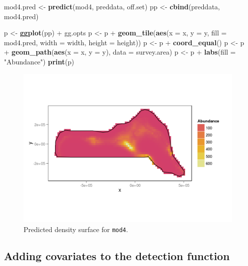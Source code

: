 \documentclass[]{amsart}
\makeatletter
\newenvironment{Shaded}{}{}
\newcommand{\KeywordTok}[1]{\textcolor[rgb]{0.00,0.44,0.13}{\textbf{{#1}}}}
\newcommand{\DataTypeTok}[1]{\textcolor[rgb]{0.56,0.13,0.00}{{#1}}}
\newcommand{\StringTok}[1]{\textcolor[rgb]{0.25,0.44,0.63}{{#1}}}
\newcommand{\NormalTok}[1]{{#1}}
\def\maxwidth{\ifdim\Gin@nat@width>\linewidth\linewidth
\else\Gin@nat@width\fi}
\let\Oldincludegraphics\includegraphics
\renewcommand{\includegraphics}[1]{\Oldincludegraphics[width=\maxwidth]{#1}}
\makeatother
\begin{document}
\begin{Shaded}
\begin{Highlighting}[]
\NormalTok{mod4.pred <-}\StringTok{ }\KeywordTok{predict}\NormalTok{(mod4, preddata, off.set)}
\NormalTok{pp <-}\StringTok{ }\KeywordTok{cbind}\NormalTok{(preddata, mod4.pred)}

\NormalTok{p <-}\StringTok{ }\KeywordTok{ggplot}\NormalTok{(pp) +}\StringTok{ }\NormalTok{gg.opts}
\NormalTok{p <-}\StringTok{ }\NormalTok{p +}\StringTok{ }\KeywordTok{geom_tile}\NormalTok{(}\KeywordTok{aes}\NormalTok{(}\DataTypeTok{x =} \NormalTok{x, }\DataTypeTok{y =} \NormalTok{y, }\DataTypeTok{fill =} \NormalTok{mod4.pred, }\DataTypeTok{width =} \NormalTok{width, }\DataTypeTok{height =} \NormalTok{height))}
\NormalTok{p <-}\StringTok{ }\NormalTok{p +}\StringTok{ }\KeywordTok{coord_equal}\NormalTok{()}
\NormalTok{p <-}\StringTok{ }\NormalTok{p +}\StringTok{ }\KeywordTok{geom_path}\NormalTok{(}\KeywordTok{aes}\NormalTok{(}\DataTypeTok{x =} \NormalTok{x, }\DataTypeTok{y =} \NormalTok{y), }\DataTypeTok{data =} \NormalTok{survey.area)}
\NormalTok{p <-}\StringTok{ }\NormalTok{p +}\StringTok{ }\KeywordTok{labs}\NormalTok{(}\DataTypeTok{fill =} \StringTok{"Abundance"}\NormalTok{)}
\KeywordTok{print}\NormalTok{(p)}
\end{Highlighting}
\end{Shaded}

\begin{figure}[htbp]
\centering
\includegraphics{mexico-figs/mod4-pred.png}
\caption{Predicted density surface for \texttt{mod4}.}
\end{figure}

\subsection{Adding covariates to the detection function}
\end{document}
